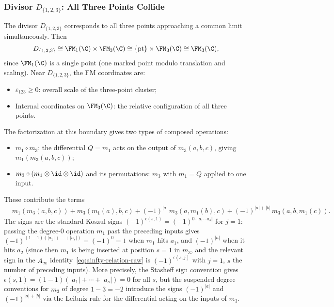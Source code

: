 \subsubsection{Divisor $D_{\{1,2,3\}}$: All Three Points Collide}

\begin{computation}[$D_{\{1,2,3\}}$ contribution]
\label{comp:D123}
The divisor $D_{\{1,2,3\}}$ corresponds to all three points approaching a common limit simultaneously. Then
\[
D_{\{1,2,3\}} \cong \FM_1(\C) \times \FM_3(\C) \cong \{\mathrm{pt}\} \times \FM_3(\C) \cong \FM_3(\C),
\]
since $\FM_1(\C)$ is a single point (one marked point modulo translation and scaling). Near $D_{\{1,2,3\}}$, the FM coordinates are:
\begin{itemize}
\item $\varepsilon_{123} \geq 0$: overall scale of the three-point cluster;
\item Internal coordinates on $\FM_3(\C)$: the relative configuration of all three points.
\end{itemize}
The factorization at this boundary gives two types of composed operations:
\begin{itemize}
\item $m_1 \circ m_3$: the differential $Q = m_1$ acts on the output of $m_3(a,b,c)$, giving $m_1(m_3(a,b,c))$;
\item $m_3 \circ (m_1 \otimes \id \otimes \id)$ and its permutations: $m_3$ with $m_1 = Q$ applied to one input.
\end{itemize}
These contribute the terms
\begin{align*}
&m_1(m_3(a,b,c)) + m_3(m_1(a), b, c) + (-1)^{|a|}\, m_3(a, m_1(b), c) + (-1)^{|a|+|b|}\, m_3(a, b, m_1(c)).
\end{align*}
The signs are the standard Koszul signs $(-1)^{\epsilon(s,1)} = (-1)^{0 \cdot |a_1 \cdots a_s|}$ for $j=1$: passing the degree-$0$ operation $m_1$ past the preceding inputs gives $(-1)^{(1-1)(|a_1|+\cdots+|a_s|)} = (-1)^0 = 1$ when $m_1$ hits $a_1$, and $(-1)^{|a|}$ when it hits $a_2$ (since then $m_1$ is being inserted at position $s=1$ in $m_3$, and the relevant sign in the $A_\infty$ identity~\eqref{eq:ainfty-relation-raw} is $(-1)^{\epsilon(s,j)}$ with $j=1$, $s$ the number of preceding inputs). More precisely, the Stasheff sign convention gives $\epsilon(s,1) = (1-1)(|a_1|+\cdots+|a_s|) = 0$ for all $s$, but the suspended degree conventions for $m_3$ of degree $1-3 = -2$ introduce the signs $(-1)^{|a|}$ and $(-1)^{|a|+|b|}$ via the Leibniz rule for the differential acting on the inputs of $m_3$.
\end{computation}

